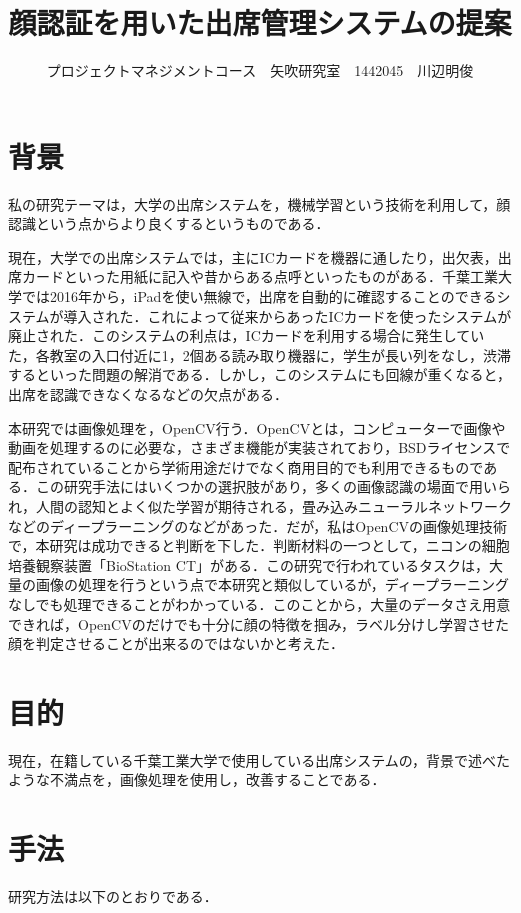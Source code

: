 \documentclass[uplatex,twocolumn,dvipdfmx]{jsarticle}
\title{\vspace{-5mm}\fontsize{14pt}{0pt}\selectfont 顔認証を用いた出席管理システムの提案}
\author{\normalsize プロジェクトマネジメントコース　矢吹研究室　1442045　川辺明俊}
\date{}
\begin{document}
\fontsize{10.5pt}{\baselineskip}\selectfont
\maketitle





\section{背景}

私の研究テーマは，大学の出席システムを，機械学習という技術を利用して，顔認識という点からより良くするというものである．

現在，大学での出席システムでは，主にICカードを機器に通したり，出欠表，出席カードといった用紙に記入や昔からある点呼といったものがある．千葉工業大学では2016年から，iPadを使い無線で，出席を自動的に確認することのできるシステムが導入された．これによって従来からあったICカードを使ったシステムが廃止された．このシステムの利点は，ICカードを利用する場合に発生していた，各教室の入口付近に1，2個ある読み取り機器に，学生が長い列をなし，渋滞するといった問題の解消である．しかし，このシステムにも回線が重くなると，出席を認識できなくなるなどの欠点がある．

本研究では画像処理を，OpenCV行う．OpenCVとは，コンピューターで画像や動画を処理するのに必要な，さまざま機能が実装されており，BSDライセンスで配布されていることから学術用途だけでなく商用目的でも利用できるものである\cite{a}．この研究手法にはいくつかの選択肢があり，多くの画像認識の場面で用いられ，人間の認知とよく似た学習が期待される，畳み込みニューラルネットワークなどのディープラーニングのなどがあった．だが，私はOpenCVの画像処理技術で，本研究は成功できると判断を下した．判断材料の一つとして，ニコンの細胞培養観察装置「BioStation CT」がある．この研究で行われているタスクは，大量の画像の処理を行うという点で本研究と類似しているが，ディープラーニングなしでも処理できることがわかっている．このことから，大量のデータさえ用意できれば，OpenCVのだけでも十分に顔の特徴を掴み，ラベル分けし学習させた顔を判定させることが出来るのではないかと考えた．

\section{目的}
現在，在籍している千葉工業大学で使用している出席システムの，背景で述べたような不満点を，画像処理を使用し，改善することである．
\section{手法}
研究方法は以下のとおりである．
\end{document}
